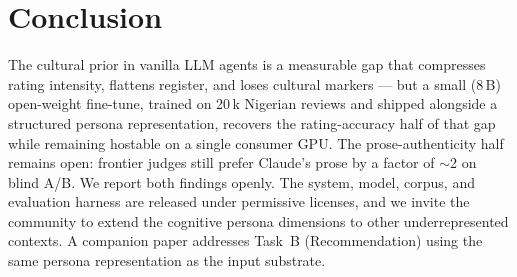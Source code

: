 \documentclass[sigconf,nonacm,balance]{acmart}
\begin{document}
\section{Conclusion}

The cultural prior in vanilla LLM agents is a measurable gap that
compresses rating intensity, flattens register, and loses cultural
markers --- but a small (8\,B) open-weight fine-tune, trained on 20\,k
Nigerian reviews and shipped alongside a structured persona
representation, recovers the rating-accuracy half of that gap while
remaining hostable on a single consumer GPU. The prose-authenticity
half remains open: frontier judges still prefer Claude's prose by a
factor of $\sim$2 on blind A/B. We report both findings openly. The
system, model, corpus, and evaluation harness are released under
permissive licenses, and we invite the community to extend the
cognitive persona dimensions to other underrepresented contexts.
A companion paper addresses Task~B (Recommendation) using the same
persona representation as the input substrate.



\end{document}
